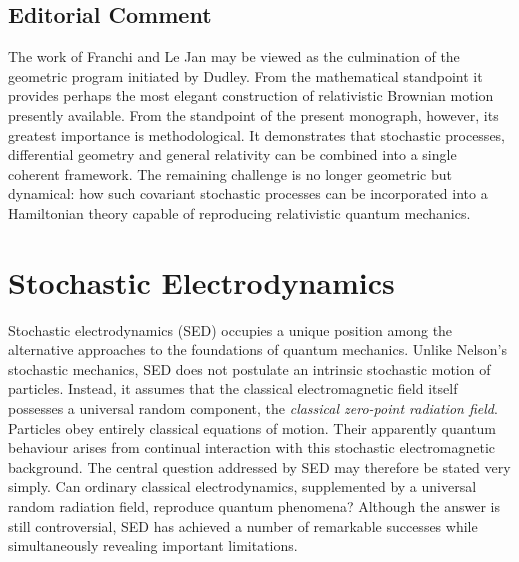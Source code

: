 \subsection*{Editorial Comment}
The work of Franchi and Le Jan may be viewed as the culmination of the
geometric program initiated by Dudley.
From the mathematical standpoint it provides perhaps the most elegant
construction of relativistic Brownian motion presently available.
From the standpoint of the present monograph, however, its greatest
importance is methodological.
It demonstrates that stochastic processes, differential geometry and
general relativity can be combined into a single coherent framework.
The remaining challenge is no longer geometric but dynamical:
how such covariant stochastic processes can be incorporated into a
Hamiltonian theory capable of reproducing relativistic quantum
mechanics.
\section{Stochastic Electrodynamics}
\label{sec:SED}
Stochastic electrodynamics (SED) occupies a unique position among the
alternative approaches to the foundations of quantum mechanics.
Unlike Nelson's stochastic mechanics, SED does not postulate an
intrinsic stochastic motion of particles.
Instead, it assumes that the classical electromagnetic field itself
possesses a universal random component, the
\emph{classical zero-point radiation field}.
Particles obey entirely classical equations of motion.
Their apparently quantum behaviour arises from continual interaction
with this stochastic electromagnetic background.
The central question addressed by SED may therefore be stated very
simply.
Can ordinary classical electrodynamics, supplemented by a universal
random radiation field, reproduce quantum phenomena?
Although the answer is still controversial, SED has achieved a number of
remarkable successes while simultaneously revealing important
limitations.

